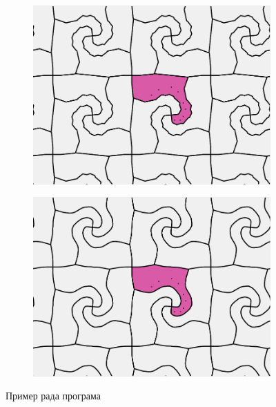 \documentclass[12pt]{report}
\begin{document}
\begin{figure}[h]
\begin{subfigure}[b]{0.323\textwidth}
  \end{subfigure}

\quad


  \begin{subfigure}[b]{0.5\textwidth}
    \includegraphics[width=.9\textwidth]{s5.png}

  
  \end{subfigure}
  \begin{subfigure}[b]{0.5\textwidth}
    \includegraphics[width=.9\textwidth]{s6.png}

  \end{subfigure}
  \caption{Пример рада програма}
  \label{slk_rad}
\end{figure}
\end{document}
